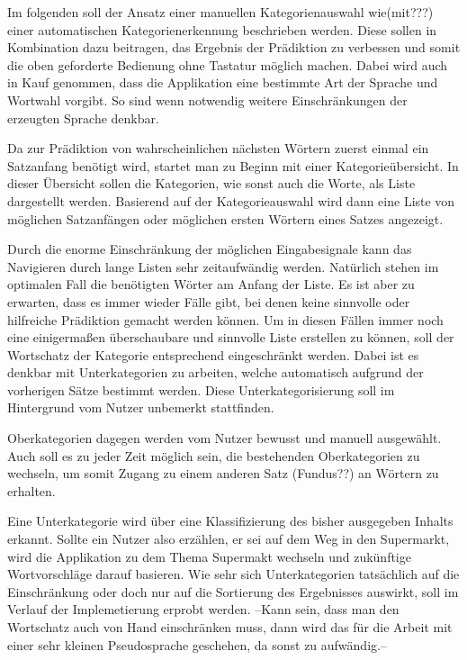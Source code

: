     	Im folgenden soll der Ansatz einer manuellen Kategorienauswahl wie(mit???) einer automatischen Kategorienerkennung beschrieben werden. Diese sollen in Kombination dazu beitragen, das Ergebnis der Prädiktion zu verbessen und somit die oben geforderte Bedienung ohne Tastatur möglich machen. Dabei wird auch in Kauf genommen, dass die Applikation eine bestimmte Art der Sprache und Wortwahl vorgibt. So sind wenn notwendig weitere Einschränkungen der erzeugten Sprache denkbar.
        
    	Da zur Prädiktion von wahrscheinlichen nächsten Wörtern zuerst einmal ein Satzanfang benötigt wird, startet man zu Beginn mit einer Kategorieübersicht. In dieser Übersicht sollen die Kategorien, wie sonst auch die Worte, als Liste dargestellt werden. Basierend auf der Kategorieauswahl wird dann eine Liste von möglichen Satzanfängen oder möglichen ersten Wörtern eines Satzes angezeigt. 
        
        Durch die enorme Einschränkung der möglichen Eingabesignale kann das Navigieren durch lange Listen sehr zeitaufwändig werden. Natürlich stehen im optimalen Fall die benötigten Wörter am Anfang der Liste. Es ist aber zu erwarten, dass es immer wieder Fälle gibt, bei denen keine sinnvolle oder hilfreiche Prädiktion gemacht werden können. Um in diesen Fällen immer noch eine einigermaßen überschaubare und sinnvolle Liste erstellen zu können, soll der Wortschatz der Kategorie entsprechend eingeschränkt werden. Dabei ist es denkbar mit Unterkategorien zu arbeiten, welche automatisch aufgrund der vorherigen Sätze bestimmt werden. Diese Unterkategorisierung soll im Hintergrund vom Nutzer unbemerkt stattfinden. 
        
        Oberkategorien dagegen werden vom Nutzer bewusst und manuell ausgewählt. Auch soll es zu jeder Zeit möglich sein, die bestehenden Oberkategorien zu wechseln, um somit Zugang zu einem anderen Satz (Fundus??) an Wörtern zu erhalten.
        
        Eine Unterkategorie wird über eine Klassifizierung des bisher ausgegeben Inhalts erkannt. Sollte ein Nutzer also erzählen, er sei auf dem Weg in den Supermarkt, wird die Applikation zu dem Thema Supermakt wechseln und zukünftige Wortvorschläge darauf basieren. Wie sehr sich Unterkategorien tatsächlich auf die Einschränkung oder doch nur auf die Sortierung des Ergebnisses auswirkt, soll im Verlauf der Implemetierung erprobt werden. --Kann sein, dass man den Wortschatz auch von Hand einschränken muss, dann wird das für die Arbeit mit einer sehr kleinen Pseudosprache geschehen, da sonst zu aufwändig.--  
        
